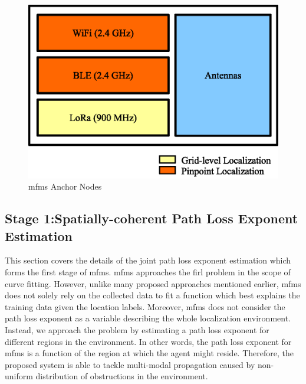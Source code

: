     \begin{figure}[thpb]
       \centering
       \includegraphics[width=0.8\linewidth, scale=0.6]{figures/mfms_module.eps}
       \caption{\label{fig:module}\gls{mfms} Anchor Nodes}
    \end{figure}

    \subsection{Stage 1:Spatially-coherent Path Loss Exponent Estimation}
    This section covers the details of the joint path loss exponent estimation which forms the first stage of \gls{mfms}.
    \gls{mfms} approaches the \gls{firl} problem in the scope of curve fitting.
    However, unlike many proposed approaches mentioned earlier, \gls{mfms} does not solely rely on the collected data to fit a function which best explains the training data given the location labels.
    Moreover, \gls{mfms} does not consider the path loss exponent as a variable describing the whole localization environment.
    Instead, we approach the problem by estimating a path loss exponent for different regions in the environment.
    In other words, the path loss exponent for \gls{mfms} is a function of the region at which the agent might reside.
    Therefore, the proposed system is able to tackle multi-modal propagation caused by non-uniform distribution of obstructions in the environment.


